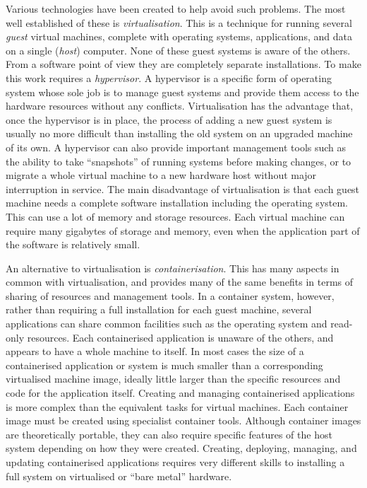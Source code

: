Various technologies have been created to help avoid such problems. The most well established of these is \emph{\gls{virtualisation}}. This is a technique for running several \emph{guest} \gls{virtual machine}s, complete with operating systems, applications, and data on a single (\emph{host}) computer. None of these guest systems is aware of the others. From a software point of view they are completely separate installations. To make this work requires a \emph{hypervisor}. A \gls{hypervisor} is a specific form of \gls{operating system} whose sole job is to manage guest systems and provide them access to the hardware resources without any conflicts. Virtualisation has the advantage that, once the hypervisor is in place, the process of adding a new guest system is usually no more difficult than installing the old system on an upgraded machine of its own. A hypervisor can also provide important management tools such as the ability to take \enquote{snapshots} of running systems before making changes, or to migrate a whole virtual machine to a new hardware host without major interruption in service. The main disadvantage of virtualisation is that each guest machine needs a complete software installation including the operating system. This can use a lot of memory and storage resources. Each virtual machine can require many gigabytes of storage and memory, even when the application part of the software is relatively small.

An alternative to \gls{virtualisation} is \emph{\gls{containerisation}}. This has many aspects in common with virtualisation, and provides many of the same benefits in terms of sharing of resources and management tools. In a container system, however, rather than requiring a full installation for each guest machine, several applications can share common facilities such as the operating system and read-only resources. Each containerised application is unaware of the others, and appears to have a whole machine to itself. In most cases the size of a containerised application or system is much smaller than a corresponding virtualised machine image, ideally little larger than the specific resources and code for the application itself. Creating and managing containerised applications is more complex than the equivalent tasks for virtual machines. Each container image must be created using specialist container tools. Although container images are theoretically portable, they can also require specific features of the host system depending on how they were created. Creating, deploying, managing, and updating containerised applications requires very different skills to installing a full system on virtualised or \enquote{\gls{bare metal}} hardware.

